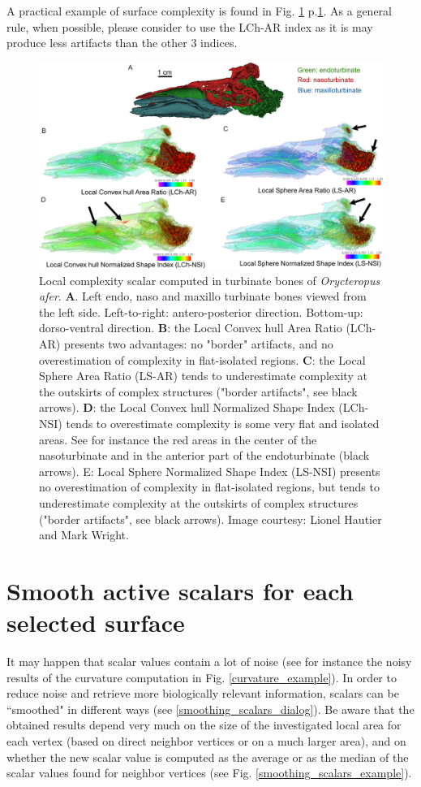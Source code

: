 A practical example of surface complexity is found in Fig. \ref{complexityexample} p.\ref{complexityexample}. As a general rule, when possible, please consider to use the LCh-AR index as it is may produce less artifacts than the other 3 indices.
\begin{figure}
  \centering
  \includegraphics[scale=0.38]{images/11/complexity_example.jpg} 
	\caption{ 
Local complexity scalar computed in turbinate bones of \textit{Orycteropus afer}. \textbf{A}. Left endo, naso and maxillo turbinate bones viewed from the left side. Left-to-right: antero-posterior direction. Bottom-up: dorso-ventral direction. \textbf{B}: the Local Convex hull Area Ratio (LCh-AR) presents two advantages: no "border" artifacts, and no overestimation of complexity in flat-isolated regions.  \textbf{C}: the Local Sphere Area Ratio (LS-AR) tends to underestimate complexity at the outskirts of complex structures ("border artifacts", see black arrows).  \textbf{D}: the Local Convex hull Normalized Shape Index (LCh-NSI) tends to overestimate complexity is some very flat and isolated areas. See for instance the red areas in the center of the nasoturbinate and in the anterior part of the endoturbinate (black arrows). E: Local Sphere Normalized Shape Index (LS-NSI) presents no overestimation of complexity in flat-isolated regions, but tends to underestimate complexity at the outskirts of complex structures ("border artifacts", see black arrows). Image courtesy: Lionel Hautier and Mark Wright.
	}
\label{complexityexample}
\end{figure}

\section{Smooth active scalars for each selected surface}
It may happen that scalar values contain a lot of noise (see for instance the noisy results of the curvature computation in Fig. \ref{curvature_example}). In order to reduce noise and retrieve more biologically relevant information, scalars can be ``smoothed" in different ways (see \ref{smoothing_scalars_dialog}). Be aware that the obtained results depend very much on the size of the investigated local area for each vertex (based on direct neighbor vertices or on a much larger area), and on whether the new scalar value is computed as the average or as the median of the scalar values found for neighbor vertices (see Fig. \ref{smoothing_scalars_example}).

